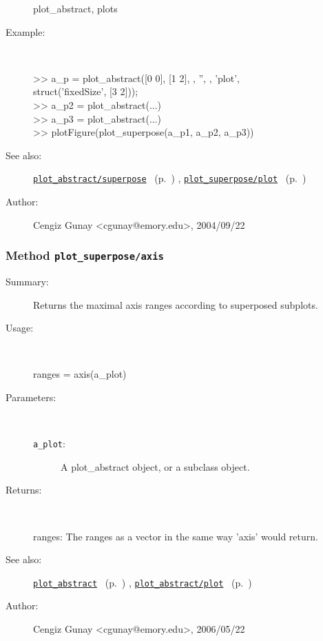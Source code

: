 \begin{description}
	plot\_abstract, plots
%
\item[Example:]~
\begin{lyxcode} >> a\_p = plot\_abstract({[0 0], [1 2]}, {}, '', {}, 'plot',
\\%
      struct('fixedSize', [3 2]));
\\%
 >> a\_p2 = plot\_abstract(...)
\\%
 >> a\_p3 = plot\_abstract(...)
\\%
 >> plotFigure(plot\_superpose({a\_p1, a\_p2, a\_p3}))
\\%
\end{lyxcode}
%
\item[See also:]%
\hyperlink{ref_plot_abstract__superpose}{\texttt{plot\_abstract/superpose}}%
\ (p.~\pageref{ref_plot_abstract__superpose})%
%
, \hyperlink{ref_plot_superpose__plot}{\texttt{plot\_superpose/plot}}%
\ (p.~\pageref{ref_plot_superpose__plot})%
%
%
\item[Author:]%
Cengiz Gunay <cgunay@emory.edu>, 2004/09/22
%
\end{description}
\methodline%
\subsubsection[Method \texttt{axis}]{Method \texttt{plot\_superpose/axis}}%
%
\label{ref_plot_superpose__axis}%
\hypertarget{ref_plot_superpose__axis}{}%
\begin{description}
\item[Summary:]Returns the maximal axis ranges according to superposed subplots.
%
\item[Usage:]~%
\begin{lyxcode}%
ranges = axis(a\_plot)
%
\end{lyxcode}%
%
%
\item[Parameters:]~
\begin{description}%
\item[\texttt{a\_plot}:]
 A plot\_abstract object, or a subclass object.
\end{description}%
%
\item[Returns:
]~

	ranges: The ranges as a vector in the same way 'axis' would return.
%
%
\item[See also:]%
\hyperlink{ref_plot_abstract}{\texttt{plot\_abstract}}%
\ (p.~\pageref{ref_plot_abstract})%
%
, \hyperlink{ref_plot_abstract__plot}{\texttt{plot\_abstract/plot}}%
\ (p.~\pageref{ref_plot_abstract__plot})%
%
%
\item[Author:]%
Cengiz Gunay <cgunay@emory.edu>, 2006/05/22
%
\end{description}
\methodline%
